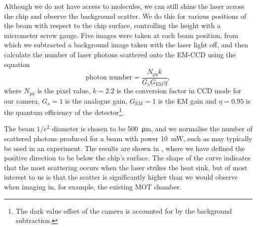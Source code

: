 Although we do not have access to molecules, we can still shine the laser
across the chip and observe the background scatter. We do this for various
positions of the beam with respect to the chip surface, controlling the height
with a micrometer screw gauge. Five images were taken at each beam position,
from which we subtracted a background image taken with the laser light off, and
then calculate the number of laser photons scattered onto the EM-CCD using the
equation
%
\begin{equation}
  \text{photon number} = \frac{N_\text{px} k}{G_\text{a}
    G_\text{EM}\eta},
\end{equation}
%
where $N_\text{px}$ is the pixel value, $k=2.2$ is the conversion factor in CCD
mode for our camera, $G_\text{a}=1$ is the analogue gain,
$G_\text{EM}=1$ is the EM gain and $\eta=0.95$ is the quantum efficiency of the
detector\footnote{The dark value offset of the camera is accounted for by the 
background subtraction.}.

The beam $1/e^2$ diameter is chosen to be \SI{500}{\micro\meter}, and we
normalise the number of scattered photons produced for a beam with power
\SI{10}{\milli\watt}, such as may typically be used in an experiment. The
results are shown in , where we have defined the
positive direction to be below the chip's surface. The shape of the curve
indicates that the most scattering occurs when the laser strikes the heat sink,
but of most interest to us is that the scatter is significantly higher than we
would observe when imaging in, for example, the existing MOT chamber.


